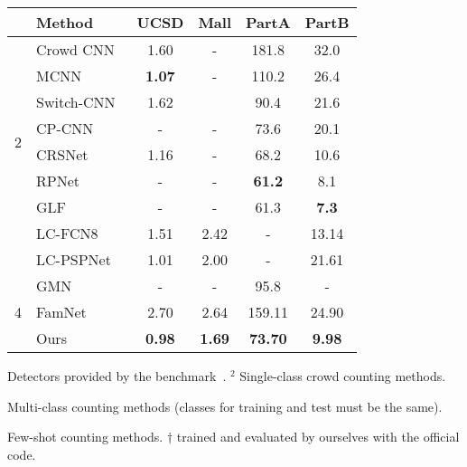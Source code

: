 \documentclass[10pt,twocolumn,letterpaper]{article}
\begin{document}
\begin{table}[t]
\begin{minipage}[t]{0.48\textwidth}
\begin{threeparttable}
\begin{tabular}{clcccc}
\toprule
 & Method & UCSD & Mall & PartA & PartB \\
\midrule
\multirow{8}{*}{2}
& Crowd CNN~\cite{crowd_cnn}   & 1.60    & -        & 181.8     & 32.0     \\
& MCNN~\cite{mcnn}             & \textbf{1.07} & -  & 110.2     & 26.4     \\
& Switch-CNN~\cite{switch_cnn} & 1.62    &          & 90.4      & 21.6     \\
& CP-CNN~\cite{cp_cnn}         & -       & -        & 73.6      & 20.1     \\
& CRSNet~\cite{crsnet}         & 1.16    & -        & 68.2      & 10.6     \\
& RPNet~\cite{rpnet}           & -       & -        & \textbf{61.2} & 8.1      \\
& GLF~\cite{glf}               & -       & -        & 61.3          & \textbf{7.3}      \\
\cmidrule{1-6}
\multirow{2}{*}{3}
& LC-FCN8~\cite{blobs}         & 1.51      & 2.42      & -           & 13.14    \\
& LC-PSPNet~\cite{blobs}       & 1.01      & 2.00      & -           & 21.61    \\
\cmidrule{1-6}
\multirow{3}{*}{4}
& GMN~\cite{gmn}               & -         & -         & 95.8        & -        \\
& FamNet~\cite{famnet}         & 2.70\tnote{\dag} & 2.64\tnote{\dag} & 159.11\tnote{\dag} & 24.90\tnote{\dag} \\
\cmidrule{2-6}
& Ours & \textbf{0.98} & \textbf{1.69} & \textbf{73.70} & \textbf{9.98}     \\
\bottomrule
\end{tabular}
\end{threeparttable}
\end{minipage}
\begin{threeparttable}
\begin{tablenotes}
\scriptsize
\item[1] Detectors provided by the benchmark~\cite{lpn}. \quad $^2$ Single-class crowd counting methods. 
\item[3] Multi-class counting methods (classes for training and test must be the same). \item[4] Few-shot counting methods. \quad $\dag$ trained and evaluated by ourselves with the official code.
\end{tablenotes}
\end{threeparttable}
\vspace{-10pt}
\label{tab:res_car_crowd}
\end{table}
\fi
\end{document}

